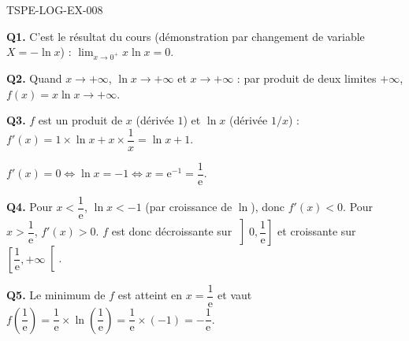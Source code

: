 \begin{corrige}{TSPE-LOG-EX-008}

\textbf{Q1.} C'est le résultat du cours (démonstration par changement de variable $X=-\ln x$) : $\displaystyle\lim_{x \to 0^+} x\ln x = 0$.

\textbf{Q2.} Quand $x \to +\infty$, $\ln x \to +\infty$ et $x \to +\infty$ : par produit de deux limites $+\infty$, $f(x) = x\ln x \to +\infty$.

\textbf{Q3.} $f$ est un produit de $x$ (dérivée $1$) et $\ln x$ (dérivée $1/x$) : $f'(x) = 1 \times \ln x + x \times \dfrac{1}{x} = \ln x + 1$.

$f'(x) = 0 \iff \ln x = -1 \iff x = \mathrm{e}^{-1} = \dfrac{1}{\mathrm{e}}$.

\textbf{Q4.} Pour $x < \dfrac{1}{\mathrm{e}}$, $\ln x < -1$ (par croissance de $\ln$), donc $f'(x) < 0$. Pour $x > \dfrac{1}{\mathrm{e}}$, $f'(x) > 0$. $f$ est donc décroissante sur $\left]0, \dfrac{1}{\mathrm{e}}\right]$ et croissante sur $\left[\dfrac{1}{\mathrm{e}}, +\infty\right[$.

\textbf{Q5.} Le minimum de $f$ est atteint en $x=\dfrac{1}{\mathrm{e}}$ et vaut $f\!\left(\dfrac{1}{\mathrm{e}}\right) = \dfrac{1}{\mathrm{e}} \times \ln\!\left(\dfrac{1}{\mathrm{e}}\right) = \dfrac{1}{\mathrm{e}} \times (-1) = -\dfrac{1}{\mathrm{e}}$.

\end{corrige}
